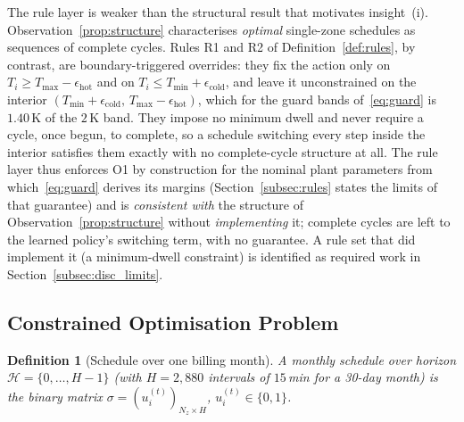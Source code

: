 \documentclass[pdflatex,sn-mathphys-num,iicol]{sn-jnl}
\theoremstyle{thmstyleone}\newtheorem{proposition}{Proposition}\newtheorem{corollary}{Corollary}
\theoremstyle{thmstyletwo}\newtheorem{remark}{Remark}\newtheorem{observation}{Observation}
\theoremstyle{thmstylethree}\newtheorem{definition}{Definition}
\newcommand{\sched}{\sigma}
\newcommand{\Tmin}{T_{\min}}
\newcommand{\Tmax}{T_{\max}}
\begin{document}
The rule layer is weaker than the structural result that motivates insight~(i). Observation~\ref{prop:structure} characterises \emph{optimal} single-zone schedules as sequences of complete cycles. Rules R1 and R2 of Definition~\ref{def:rules}, by contrast, are boundary-triggered overrides: they fix the action only on $T_i\ge\Tmax-\epsilon_{\mathrm{hot}}$ and on $T_i\le\Tmin+\epsilon_{\mathrm{cold}}$, and leave it unconstrained on the interior $(\Tmin+\epsilon_{\mathrm{cold}},\,\Tmax-\epsilon_{\mathrm{hot}})$, which for the guard bands of~\eqref{eq:guard} is $1.40\,$K of the $2\,$K band. They impose no minimum dwell and never require a cycle, once begun, to complete, so a schedule switching every step inside the interior satisfies them exactly with no complete-cycle structure at all. The rule layer thus enforces O1 by construction for the nominal plant parameters from which~\eqref{eq:guard} derives its margins (Section~\ref{subsec:rules} states the limits of that guarantee) and is \emph{consistent with} the structure of Observation~\ref{prop:structure} without \emph{implementing} it; complete cycles are left to the learned policy's switching term, with no guarantee. A rule set that did implement it (a minimum-dwell constraint) is identified as required work in Section~\ref{subsec:disc_limits}.
 
\subsection{Constrained Optimisation Problem}
\label{subsec:cop}
 
\begin{definition}[Schedule over one billing month]
\label{def:schedule}
A \emph{monthly schedule} over horizon $\mathcal{H}=\{0,\ldots,H-1\}$ (with $H=2{,}880$ intervals of $15\,$min for a 30-day month) is the binary matrix $\sched=(u_i^{(t)})_{N_z\times H}$, $u_i^{(t)}\in\{0,1\}$.
\end{definition}
 
\end{document}

